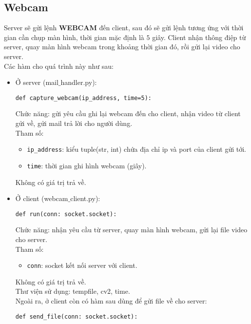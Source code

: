 \subsection{Webcam}
Server sẽ gửi lệnh \textbf{WEBCAM} đến client, sau đó sẽ gửi lệnh tương ứng với thời gian cần chụp màn hình, thời gian mặc định là $5$ giây. Client nhận thông điệp từ server, quay màn hình webcam trong khoảng thời gian đó, rồi gửi lại video cho server.\\
Các hàm cho quá trình này như sau:
\begin{itemize}
\item Ở server (mail$\_$handler.py):
\begin{lstlisting}
def capture_webcam(ip_address, time=5):
\end{lstlisting}
Chức năng: gửi yêu cầu ghi lại webcam đến cho client, nhận video từ client gửi về, gửi mail trả lời cho người dùng.\\
Tham số: 
\begin{itemize}
\item \lstinline{ip_address}: kiểu tuple(str, int) chứa địa chỉ ip và port của client gửi tới.
\item \lstinline{time}: thời gian ghi hình webcam (giây).
\end{itemize}
Không có giá trị trả về.
\item Ở client (webcam$\_$client.py):
\begin{lstlisting}
def run(conn: socket.socket):
\end{lstlisting}
Chức năng: nhận yêu cầu từ server, quay màn hình webcam, gửi lại file video cho server.\\
Tham số: 
\begin{itemize}
\item \lstinline{conn}: socket kết nối server với client.
\end{itemize}
Không có giá trị trả về.\\
Thư viện sử dụng: tempfile, cv2, time.\\
Ngoài ra, ở client còn có hàm sau dùng để gửi file về cho server:
\begin{lstlisting}
def send_file(conn: socket.socket):
\end{lstlisting}
\end{itemize}



